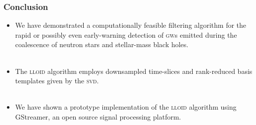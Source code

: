 \documentclass{beamer}
\begin{document}
\begin{frame}
	\frametitle{Conclusion}
	\begin{itemize}
		\item We have demonstrated a computationally feasible filtering
		algorithm for the rapid or possibly even early-warning
		detection of \textsc{gw}s emitted during the coalescence of neutron
		stars and stellar-mass black holes. \\~\\
		\item The \textsc{lloid} algorithm employs downsampled time-slices and
		rank-reduced basis templates given by the \textsc{svd}. \\~\\
		\item We have shown a prototype implementation of the \textsc{lloid}
		algorithm using GStreamer, an open source signal processing platform.
	\end{itemize}
\end{frame}
\end{document}
